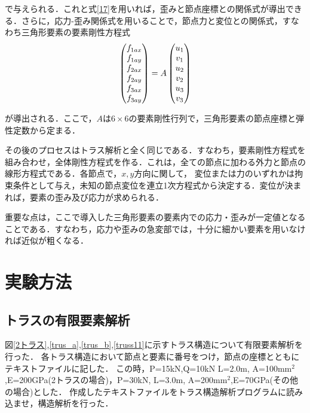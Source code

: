 \documentclass[a4paper,11pt,uplatex]{jsarticle}
\begin{document}
で与えられる．これと式\ref{17}を用いれば，歪みと節点座標との関係式が導出できる．さらに，応力-歪み関係式を用いることで，節点力と変位との関係式，すなわち三角形要素の要素剛性方程式
\begin{align}
  \begin{pmatrix} f_{1ax} \\ f_{1ay} \\ f_{2ax} \\ f_{2ay} \\ f_{3ax} \\ f_{3ay} \end{pmatrix} = A \begin{pmatrix} u_1 \\ v_1 \\ u_2 \\ v_2 \\ u_3 \\ v_3 \end{pmatrix}
\end{align}

が導出される．ここで，$A$は$6 \times 6$の要素剛性行列で，三角形要素の節点座標と弾性定数から定まる．
\par
その後のプロセスはトラス解析と全く同じである．すなわち，要素剛性方程式を組み合わせ，全体剛性方程式を作る．これは，全ての節点に加わる外力と節点の線形方程式である．各節点で，$x,y$方向に関して，
変位または力のいずれかは拘束条件として与え，未知の節点変位を連立1次方程式から決定する．変位が決まれば，要素の歪み及び応力が求められる．
\par
重要な点は，ここで導入した三角形要素の要素内での応力・歪みが一定値となることである．すなわち，応力や歪みの急変部では，十分に細かい要素を用いなければ近似が粗くなる．

\section{実験方法}
\subsection{トラスの有限要素解析}
図\ref{2トラス},\ref{trus_a},\ref{trus_b},\ref{truss11}に示すトラス構造について有限要素解析を行った．
各トラス構造において節点と要素に番号をつけ，節点の座標とともにテキストファイルに記した．
この時，P=15kN,Q=10kN L=2.0m, A=100$\mathrm{mm^2}$,E=200GPa(2トラスの場合)，P=30kN, L=3.0m, A=200$\mathrm{mm^2}$,E=70GPa(その他の場合)とした．
作成したテキストファイルをトラス構造解析プログラムに読み込ませ，構造解析を行った．
\end{document}
